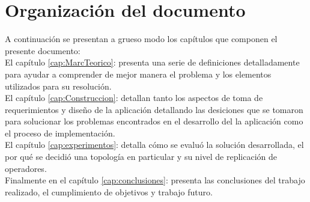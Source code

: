 \section{Organización del documento}
\label{intro:organizacion}

A continuación se presentan a grueso modo los capítulos que componen el presente documento:\\

El capítulo \ref{cap:MarcTeorico}:  presenta una serie de definiciones detalladamente para ayudar a comprender de mejor manera el problema y los elementos utilizados para su resolución.\\

El capítulo \ref{cap:Construccion}:  detallan tanto los aspectos de toma de requerimientos y diseño de la aplicación detallando las desiciones que se tomaron para solucionar los problemas encontrados en el desarrollo del la aplicación como el proceso de implementación.\\

El capítulo \ref{cap:experimentos}:  detalla cómo se evaluó la solución desarrollada, el por qué se decidió una topología en particular y su nivel de replicación de operadores.\\

Finalmente en el capítulo \ref{cap:conclusiones}:  presenta las conclusiones del trabajo realizado, el cumplimiento de objetivos y trabajo futuro.\\
